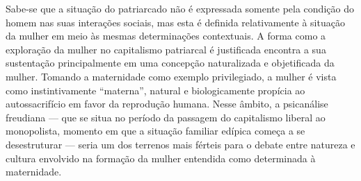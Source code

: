Sabe-se que a situação do patriarcado não é expressada somente pela
condição do homem nas suas interações sociais, mas esta é definida
relativamente à situação da mulher em meio às mesmas determinações
contextuais. A forma como a exploração da mulher no capitalismo
patriarcal é justificada encontra a sua sustentação principalmente em
uma concepção naturalizada e objetificada da mulher. Tomando a
maternidade como exemplo privilegiado, a mulher é vista como
instintivamente ``materna'', natural e biologicamente propícia ao
autossacrifício em favor da reprodução humana. Nesse âmbito, a
psicanálise freudiana --- que se situa no período da passagem do
capitalismo liberal ao monopolista, momento em que a situação familiar
edípica começa a se desestruturar --- seria um dos terrenos mais férteis
para o debate entre natureza e cultura envolvido na formação da mulher
entendida como determinada à maternidade.

